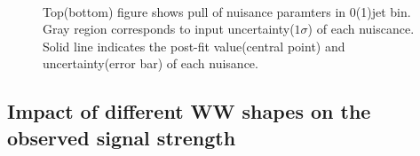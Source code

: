 \begin{figure}[!hbtp]
\centering
{}
\\
\caption{Top(bottom) figure shows pull of nuisance paramters in 0(1)jet bin.
Gray region corresponds to input uncertainty($1\sigma$) of each nuiscance. 
Solid line indicates the post-fit value(central point) and uncertainty(error bar)
of each nuisance.} 
\label{fig:postnuisance}
\end{figure}

\subsection{Impact of different WW shapes on the observed signal strength} 

